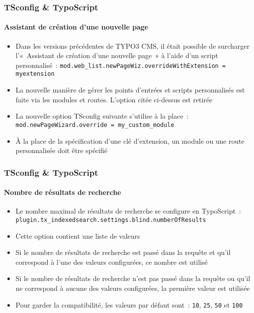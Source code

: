 \begin{frame}[fragile]
	\frametitle{TSconfig \& TypoScript}
	\framesubtitle{Assistant de création d'une nouvelle page}

	\begin{itemize}
		\item Dans les versions précédentes de TYPO3 CMS, il était possible de
			surcharger l'«~Assistant de création d'une nouvelle page~» à l'aide
			d'un script personnalisé~:\newline
			\small
				\texttt{mod.web\_list.newPageWiz.overrideWithExtension = myextension}
			\normalsize
		\item La nouvelle manière de gérer les points d'entrées et scripts personnalisés
			est faite via les modules et routes. L'option citée ci-dessus est retirée
		\item La nouvelle option TSconfig suivante s'utilise à la place~:
			\small
				\texttt{mod.newPageWizard.override = my\_custom\_module}
			\normalsize

		\item À la place de la spécification d'une clé d'extension, un module ou
			une route personnalisée doit être spécifié

	\end{itemize}

\end{frame}
\begin{frame}[fragile]
	\frametitle{TSconfig \& TypoScript}
	\framesubtitle{Nombre de résultats de recherche}

	\begin{itemize}
		\item Le nombre maximal de résultats de recherche se configure en TypoScript~:\newline
			\texttt{plugin.tx\_indexedsearch.settings.blind.numberOfResults}
		\item Cette option contient une liste de valeurs
		\item Si le nombre de résultats de recherche est passé dans la requête et qu'il
			correspond à l'une des valeurs configurées, ce nombre est utilisé
		\item Si le nombre de résultats de recherche n'est pas passé dans la requête ou
			qu'il ne correspond à aucune des valeurs configurées, la première valeur
			est utilisée
		\item Pour garder la compatibilité, les valeurs par défaut sont~:\newline
			\texttt{10}, \texttt{25}, \texttt{50} et \texttt{100}
	\end{itemize}

\end{frame}
